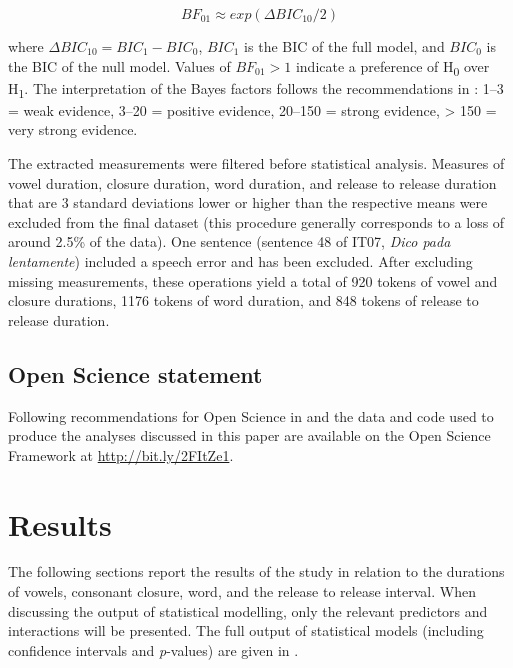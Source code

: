\documentclass[charis]{glossa}
\begin{document}
\begin{equation}
\label{eq:bayes}
BF_{01} \approx exp(\Delta{}BIC_{10}/2)
\end{equation}

where \(\Delta{}BIC_{10} = BIC_1 - BIC_0\), \(BIC_1\) is the BIC of the
full model, and \(BIC_0\) is the BIC of the null model. Values of
\(BF_{01} > 1\) indicate a preference of H\textsubscript{0} over
H\textsubscript{1}. The interpretation of the Bayes factors follows the
recommendations in \citet[p.~139]{raftery1995}: 1--3 = weak evidence,
3--20 = positive evidence, 20--150 = strong evidence, \textgreater{} 150
= very strong evidence.

The extracted measurements were filtered before statistical analysis.
Measures of vowel duration, closure duration, word duration, and release
to release duration that are 3 standard deviations lower or higher than
the respective means were excluded from the final dataset (this
procedure generally corresponds to a loss of around 2.5\% of the data).
One sentence (sentence 48 of IT07, \emph{Dico pada lentamente}) included
a speech error and has been excluded. After excluding missing
measurements, these operations yield a total of 920 tokens of vowel and
closure durations, 1176 tokens of word duration, and 848 tokens of
release to release duration.

\hypertarget{open-science-statement}{%
\subsection{Open Science statement}\label{open-science-statement}}

Following recommendations for Open Science in \citet{cruwell2018} and
\citet{berez-kroeker2018} the data and code used to produce the analyses
discussed in this paper are available on the Open Science Framework at
\url{http://bit.ly/2FItZe1}.

\hypertarget{results}{%
\section{Results}\label{results}}

The following sections report the results of the study in relation to
the durations of vowels, consonant closure, word, and the release to
release interval. When discussing the output of statistical modelling,
only the relevant predictors and interactions will be presented. The
full output of statistical models (including confidence intervals and
\emph{p}-values) are given in .
\end{document}
